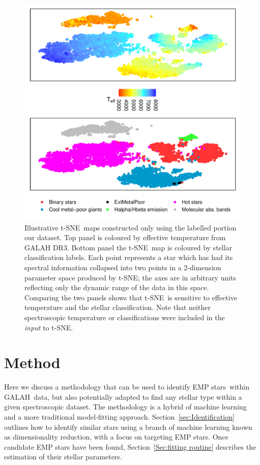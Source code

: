\documentclass[]{aastex631}
\newcommand{\g}{GALAH\xspace}
\newcommand{\ts}{t-SNE\xspace}
\newcommand{\emps}{EMP stars\xspace}
\begin{document}
\begin{figure}
\includegraphics[width=\linewidth]{Plots/Figure1.pdf}
\caption{Illustrative \ts \ maps constructed only using the labelled portion our dataset. Top panel is coloured by effective temperature from \g DR3. Bottom panel the \ts \ map is coloured by stellar classification labels. 
Each point represents a star which has had its spectral information collapsed into two points in a 2-dimension parameter space produced by \ts; the axes are in arbitrary units reflecting only the dynamic range of the data in this space. 
Comparing the two panels shows that \ts \ is sensitive to effective temperature and the stellar classification. 
Note that neither spectroscopic temperature or classifications were included in the {\em input} to \ts.}
\label{fig:Classification}
\end{figure}



	
\section{Method}\label{Sec:Method}	
Here we discuss a methodology that can be used to identify \emps \ within \g \ data, but also potentially adapted to find any stellar type within a given spectroscopic dataset. The methodology is a hybrid of machine learning and a more traditional model-fitting approach. Section~\ref{sec:Identification} outlines how to identify similar stars using a branch of machine learning known as dimensionality reduction, with a focus on targeting \emps . Once candidate \emps have been found, Section~\ref{Sec:fitting routine} describes the estimation of their stellar parameters.
\end{document}
